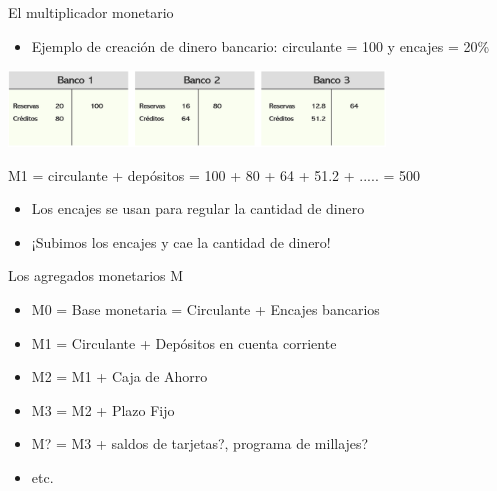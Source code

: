 \documentclass{beamer}
\begin{document}
\begin{frame}{El multiplicador monetario}
    \begin{itemize}
        \item Ejemplo de creación de dinero bancario:  circulante = 100  y  encajes = 20\%
    \end{itemize}
        \vspace{2mm}
    \centering\includegraphics[width=10cm]{Slides Principios de Economia/Figures/P51.png}\
    \vspace{2mm}
    \begin{tcolorbox}[width=4in, interior hidden, boxsep=0pt,
                  left=0pt, halign=center, valign=center, right=0pt,
                  bottom=3pt, top=3pt, ]%
                 \footnotesize{M1 = circulante + depósitos = 100 + 80 + 64 + 51.2 + ..... = 500}
    \end{tcolorbox}
        \vspace{2mm}
    \begin{itemize}
        \item Los encajes se usan para regular la cantidad de dinero
        \item ¡Subimos los encajes y cae la cantidad de dinero!  \Large\Cooley[][yellow!60!white]
        \end{itemize}
\end{frame}


\begin{frame}{Los agregados monetarios M}
     \begin{itemize}
        \item M0 = Base monetaria = Circulante + Encajes bancarios
        \item M1 = Circulante + Depósitos en cuenta corriente
        \item M2 = M1 + Caja de Ahorro
        \item M3 = M2 + Plazo Fijo
        \item M? = M3 + saldos de tarjetas?, programa de millajes? 
        \item etc.
    \end{itemize}
\end{frame}
\end{document}

